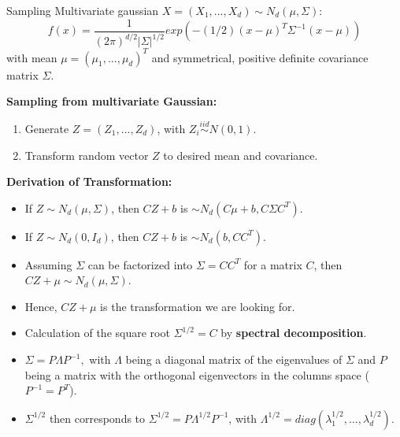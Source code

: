 \begin{vbframe}{Sampling Multivariate gaussian}
$X=(X_1, ..., X_d) \sim N_d(\mu, \Sigma)$:
$$
f(x) = \frac{1}{(2\pi)^{d/2} |\Sigma|^{1/2}}exp(-(1/2)(x-\mu)^T\Sigma^{-1}(x-\mu))
$$
with mean $\mu=(\mu_1,...,\mu_d)^T$ and symmetrical, positive definite covariance matrix $\Sigma$.

\lz

\textbf{Sampling from multivariate Gaussian:}

\lz
\begin{enumerate}
\item Generate $Z=(Z_1,...,Z_d)$, with $Z_i \stackrel{iid}{\sim} N(0,1)$.
\item Transform random vector $Z$ to desired mean and covariance.
\end{enumerate}

\framebreak

\textbf{Derivation of Transformation:}

\lz

\begin{itemize}
\item If $Z \sim N_d(\mu, \Sigma)$, then $CZ+b$ is $\sim N_d(C\mu+b, C\Sigma C^T)$.

\lz

\item If $Z \sim N_d(0,I_d)$, then $CZ+b$ is $\sim N_d(b, CC^T)$.

\lz

\item Assuming $\Sigma$ can be factorized into $\Sigma=CC^T$ for a matrix $C$, then $CZ+\mu \sim N_d(\mu, \Sigma)$.

\lz

\item Hence, $CZ+\mu$ is the transformation we are looking for.
\end{itemize}

\framebreak
\begin{itemize}
\item Calculation of the square root $\Sigma^{1/2}=C$ by \textbf{spectral decomposition}.

\lz

\item $\Sigma=P\Lambda P^{-1},$ with $\Lambda$ being a diagonal matrix of the eigenvalues of $\Sigma$ and $P$ being a matrix with the orthogonal eigenvectors in the columns space ($P^{-1}=P^T$).

\lz

\item $\Sigma^{1/2}$ then corresponds to $\Sigma^{1/2}=P\Lambda^{1/2} P^{-1}$, with $\Lambda^{1/2}=diag(\lambda_1^{1/2},..., \lambda_d^{1/2})$.


\end{itemize}
\end{vbframe}
